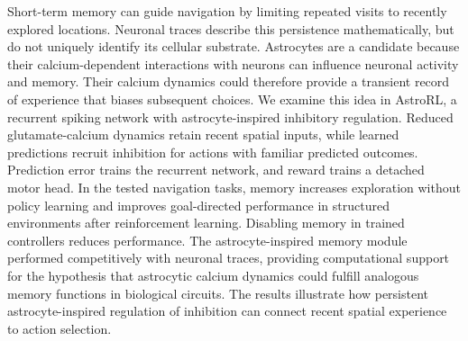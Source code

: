 Short-term memory can guide navigation by limiting repeated visits to recently explored locations. Neuronal traces describe this persistence mathematically, but do not uniquely identify its cellular substrate. Astrocytes are a candidate because their calcium-dependent interactions with neurons can influence neuronal activity and memory. Their calcium dynamics could therefore provide a transient record of experience that biases subsequent choices. We examine this idea in AstroRL, a recurrent spiking network with astrocyte-inspired inhibitory regulation. Reduced glutamate-calcium dynamics retain recent spatial inputs, while learned predictions recruit inhibition for actions with familiar predicted outcomes. Prediction error trains the recurrent network, and reward trains a detached motor head. In the tested navigation tasks, memory increases exploration without policy learning and improves goal-directed performance in structured environments after reinforcement learning. Disabling memory in trained controllers reduces performance. The astrocyte-inspired memory module performed competitively with neuronal traces, providing computational support for the hypothesis that astrocytic calcium dynamics could fulfill analogous memory functions in biological circuits. The results illustrate how persistent astrocyte-inspired regulation of inhibition can connect recent spatial experience to action selection.